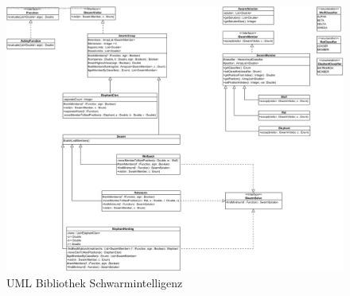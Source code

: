 \begin{figure}[ht]
    \begin{center}
        \includegraphics[width=1.0\textwidth]{../SwarmOptimization.jpg}
        \caption{UML Bibliothek Schwarmintelligenz}
        \label{uml_img}
    \end{center}
\end{figure}